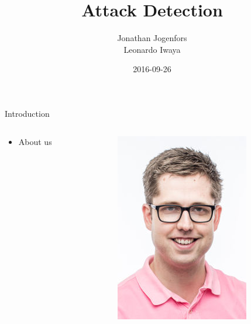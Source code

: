 \documentclass[compress]{beamer}
\title{Attack Detection}
\subtitle{}
\author{Jonathan Jogenfors\\ Leonardo Iwaya}
\date{2016-09-26}
\begin{document}
\small
\frame{\titlepage}
\begin{frame}{Introduction}
    \begin{columns}
        \begin{column}{0.8\textwidth}
    \begin{itemize}
        \item About us
    \end{itemize}
        \end{column}
        \begin{column}{0.2\textwidth}  %
            \begin{center}

                \includegraphics[width=\textwidth]{jonathan.jpg}


            \end{center}
        \end{column}
    \end{columns}
\end{frame}
\end{document}
